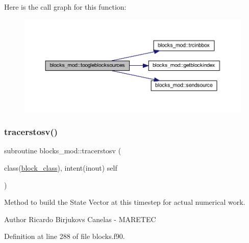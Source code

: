 Here is the call graph for this function\+:\nopagebreak
\begin{figure}[H]
\begin{center}
\leavevmode
\includegraphics[width=350pt]{namespaceblocks__mod_ab9e57cbf0103b632b2b2dfa4e4d4139c_cgraph}
\end{center}
\end{figure}
\mbox{\label{namespaceblocks__mod_aa9c438503e619aa4352081ff46b15430}} 
\subsubsection{\texorpdfstring{tracerstosv()}{tracerstosv()}}
{\footnotesize\ttfamily subroutine blocks\+\_\+mod\+::tracerstosv (\begin{DoxyParamCaption}\item[{class(\mbox{\hyperlink{structblocks__mod_1_1block__class}{block\+\_\+class}}), intent(inout)}]{self }\end{DoxyParamCaption})\hspace{0.3cm}{\ttfamily [private]}}



Method to build the State Vector at this timestep for actual numerical work. 

\begin{DoxyAuthor}{Author}
Ricardo Birjukovs Canelas -\/ M\+A\+R\+E\+T\+EC 
\end{DoxyAuthor}


Definition at line 288 of file blocks.\+f90.


